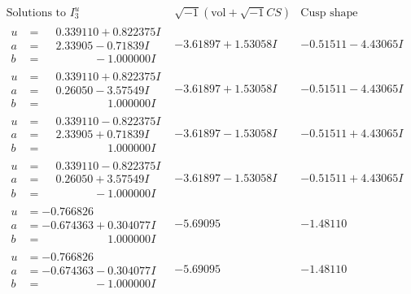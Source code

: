 \documentclass[1p]{elsarticle_modified}
\theoremstyle{definition}
\newcommand{\I}{\sqrt{-1}}
\begin{document}
$$\begin{array}{c|c|c}  
\text{Solutions to }I^u_{3}& \I (\text{vol} + \sqrt{-1}CS) & \text{Cusp shape}\\
 \hline 
\begin{aligned}
u &= \phantom{-}0.339110 + 0.822375 I \\
a &= \phantom{-}2.33905 - 0.71839 I \\
b &= \phantom{-0.000000 } -1.000000 I\end{aligned}
 & -3.61897 + 1.53058 I & -0.51511 - 4.43065 I \\ \hline\begin{aligned}
u &= \phantom{-}0.339110 + 0.822375 I \\
a &= \phantom{-}0.26050 - 3.57549 I \\
b &= \phantom{-0.000000 -}1.000000 I\end{aligned}
 & -3.61897 + 1.53058 I & -0.51511 - 4.43065 I \\ \hline\begin{aligned}
u &= \phantom{-}0.339110 - 0.822375 I \\
a &= \phantom{-}2.33905 + 0.71839 I \\
b &= \phantom{-0.000000 -}1.000000 I\end{aligned}
 & -3.61897 - 1.53058 I & -0.51511 + 4.43065 I \\ \hline\begin{aligned}
u &= \phantom{-}0.339110 - 0.822375 I \\
a &= \phantom{-}0.26050 + 3.57549 I \\
b &= \phantom{-0.000000 } -1.000000 I\end{aligned}
 & -3.61897 - 1.53058 I & -0.51511 + 4.43065 I \\ \hline\begin{aligned}
u &= -0.766826\phantom{ +0.000000I} \\
a &= -0.674363 + 0.304077 I \\
b &= \phantom{-0.000000 -}1.000000 I\end{aligned}
 & -5.69095\phantom{ +0.000000I} & -1.48110\phantom{ +0.000000I} \\ \hline\begin{aligned}
u &= -0.766826\phantom{ +0.000000I} \\
a &= -0.674363 - 0.304077 I \\
b &= \phantom{-0.000000 } -1.000000 I\end{aligned}
 & -5.69095\phantom{ +0.000000I} & -1.48110\phantom{ +0.000000I} \\ \hline\begin{aligned}

\end{aligned}
\end{array}$$
\end{document}
